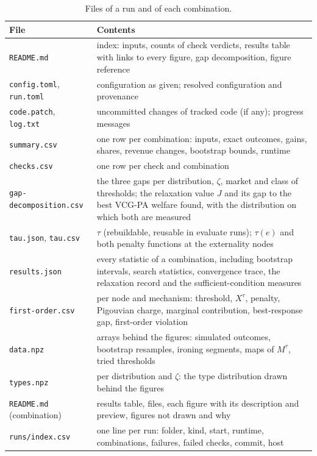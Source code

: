 \documentclass[11pt]{article}
\newcommand{\code}[1]{\texttt{#1}}
\begin{document}
\begin{table}[ht]
\centering\small
\begin{tabularx}{\linewidth}{@{}l L@{}}
\toprule
File & Contents \\
\midrule
\code{README.md} & index: inputs, counts of check verdicts, results table with links to every figure, gap decomposition, figure reference \\
\code{config.toml}, \code{run.toml} & configuration as given; resolved configuration and provenance \\
\code{code.patch}, \code{log.txt} & uncommitted changes of tracked code (if any); progress messages \\
\code{summary.csv} & one row per combination: inputs, exact outcomes, gains, shares, revenue changes, bootstrap bounds, runtime \\
\code{checks.csv} & one row per check and combination \\
\code{gap-decomposition.csv} & the three gaps per distribution, $\zeta$, market and class of thresholds; the relaxation value $J$ and its gap to the best VCG-PA welfare found, with the distribution on which both are measured \\
\code{tau.json}, \code{tau.csv} & $\tau$ (rebuildable, reusable in evaluate runs); $\tau(e)$ and both penalty functions at the externality nodes \\
\code{results.json} & every statistic of a combination, including bootstrap intervals, search statistics, convergence trace, the relaxation record and the sufficient-condition measures \\
\code{first-order.csv} & per node and mechanism: threshold, $X^\tau$, penalty, Pigouvian charge, marginal contribution, best-response gap, first-order violation \\
\code{data.npz} & arrays behind the figures: simulated outcomes, bootstrap resamples, ironing segments, maps of $M^\tau$, tried thresholds \\
\code{types.npz} & per distribution and $\zeta$: the type distribution drawn behind the figures \\
\code{README.md} (combination) & results table, files, each figure with its description and preview, figures not drawn and why \\
\code{runs/index.csv} & one line per run: folder, kind, start, runtime, combinations, failures, failed checks, commit, host \\
\bottomrule
\end{tabularx}
\caption{Files of a run and of each combination.}
\label{tab:files}
\end{table}
\end{document}
